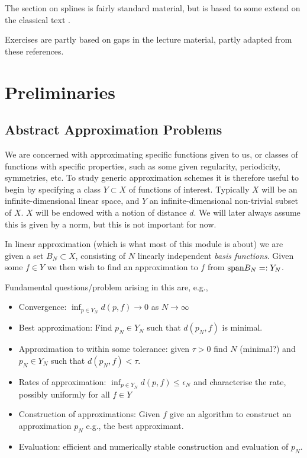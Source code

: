The section on splines is fairly standard material, but is based to some extend
on the classical text \cite{Powell1981-bg}.

Exercises are partly based on gaps in the lecture material, partly adapted from
these references.


\section{Preliminaries}
%
\label{sec:prelims}
%

\subsection{Abstract Approximation Problems}
%
We are concerned with approximating specific functions given to us, or classes
of functions with specific properties, such as some given regularity,
periodicity, symmetries, etc. To study generic approximation schemes it is
therefore useful to begin by specifying a class $Y \subset X$ of functions of
interest. Typically $X$ will be an infinite-dimensional linear space,  and $Y$
an infinite-dimensional non-trivial subset of $X$. $X$ will be endowed with
a notion of distance $d$. We will later always assume this is given by a norm,
but this is not important for now.

In linear approximation (which is what most of this module is about)
we are given a set $B_N \subset X$, consisting of $N$ linearly independent
{\em basis functions}. Given some $f \in Y$ we then wish to find
an approximation to $f$ from ${\rm span} B_N =: Y_N$.

Fundamental questions/problem arising in this are, e.g.,
\begin{itemize}
\item Convergence: $\inf_{p \in Y_N} d(p, f) \to 0$ as $N \to \infty$
\item Best approximation: Find $p_N \in Y_N$ such that $d(p_N, f)$ is minimal.
\item Approximation to within some tolerance: given $\tau > 0$ find $N$ (minimal?)
  and $p_N \in Y_N$ such that $d(p_N, f) < \tau$.
\item Rates of approximation: $\inf_{p \in Y_N} d(p, f) \leq \epsilon_N$
  and characterise the rate, possibly uniformly for all $f \in Y$
\item Construction of approximations: Given $f$ give an algorithm to
  construct an approximation $p_N$ e.g., the best approximant.
\item Evaluation: efficient and numerically stable construction and
  evaluation of $p_N$.
\end{itemize}

